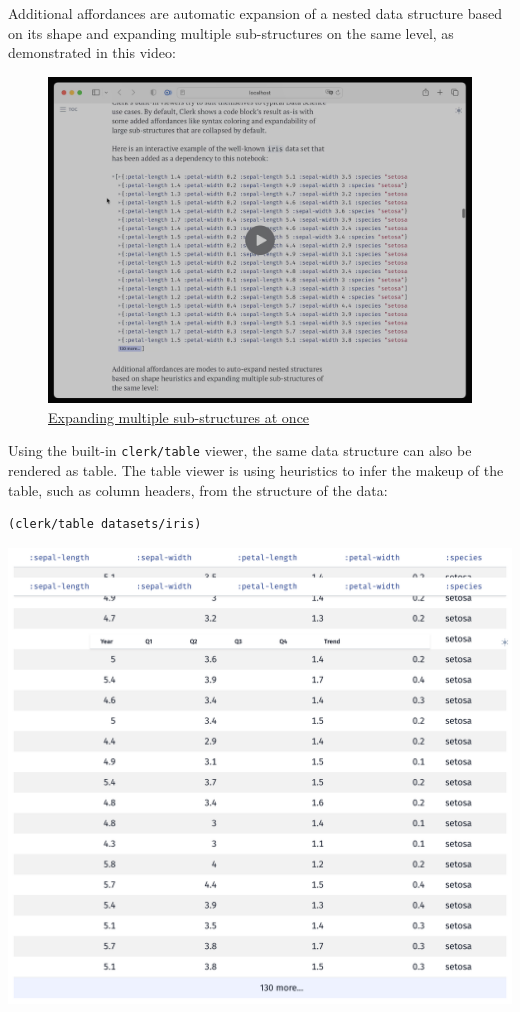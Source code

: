 \documentclass[sigconf,screen]{acmart}
\newcommand{\passthrough}[1]{#1}
\begin{document}
Additional affordances are automatic expansion of a nested data structure based on its shape and expanding multiple sub-structures on the same level, as demonstrated in this video:

\begin{figure}[H]
\centering
\includegraphics{images/expanding-multiple-sub-structures-at-once.png}
\caption{\href{https://cdn.nextjournal.com/data/QmZmxVVtwGDsdVWRD2s3etdNNJ1tuWGJPFSWrfTcPLNTYx?content-type=image/png}{Expanding multiple sub-structures at once}}
\end{figure}

Using the built-in \passthrough{\lstinline!clerk/table!} viewer, the same data structure can also be rendered as table. The table viewer is using heuristics to infer the makeup of the table, such as column headers, from the structure of the data:

\begin{lstlisting}
(clerk/table datasets/iris)
\end{lstlisting}

\includegraphics{images/anon-expr-5dtuc4aWdsThsN1ZehoANzcdjAoyh5-result.png}
\end{document}
